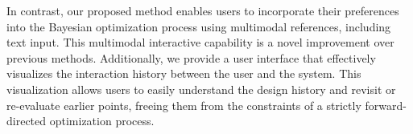 In contrast, our proposed method enables users to incorporate their preferences into the Bayesian optimization process using multimodal references, including text input.
This multimodal interactive capability is a novel improvement over previous methods.
Additionally, we provide a user interface that effectively visualizes the interaction history between the user and the system. 
This visualization allows users to easily understand the design history and revisit or re-evaluate earlier points, freeing them from the constraints of a strictly forward-directed optimization process.